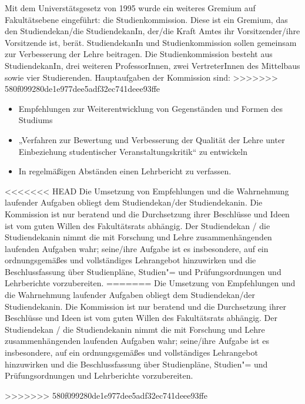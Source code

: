 Mit dem Universtätsgesetz von 1995 wurde ein weiteres Gremium auf Fakultätsebene 
eingeführt: die Studienkommission. Diese ist ein Gremium, das den Studiendekan/die
StudiendekanIn, der/die Kraft Amtes ihr Vorsitzender/ihre Vorsitzende ist, berät.
StudiendekanIn und Studienkommission sollen gemeinsam zur Verbesserung der Lehre
beitragen. Die Studienkommission besteht aus StudiendekanIn, drei weiteren
ProfessorInnen, zwei VertreterInnen des Mittelbaus sowie vier Studierenden.
Hauptaufgaben der Kommission sind:
>>>>>>> 580f099280de1e977dee5adf32ec741deee93ffe
\begin{itemize}
    \addtolength{\itemsep}{-0.7\baselineskip}
    \item Empfehlungen zur Weiterentwicklung von Gegenständen und Formen des Studiums
    \item „Verfahren zur Bewertung und Verbesserung  der Qualität der Lehre unter
          Einbeziehung studentischer Veranstaltungskritik“ zu entwickeln
    \item In regelmäßigen Abständen einen Lehrbericht zu verfassen.
\end{itemize}

<<<<<<< HEAD
Die Umsetzung von Empfehlungen und die Wahrnehmung laufender Aufgaben obliegt
dem Studiendekan/der Studiendekanin. Die Kommission ist nur beratend und die
Durchsetzung ihrer Beschlüsse und Ideen ist vom guten Willen des Fakultätsrats
abhängig. Der Studiendekan / die Studiendekanin nimmt die mit Forschung und
Lehre zusammenhängenden laufenden Aufgaben wahr; seine/ihre Aufgabe ist es
insbesondere, auf ein ordnungsgemäßes und vollständiges Lehrangebot hinzuwirken
und die Beschlussfassung über Studienpläne, Studien"= und Prüfungsordnungen und
Lehrberichte vorzubereiten.
=======
Die Umsetzung von Empfehlungen und die Wahrnehmung laufender Aufgaben
obliegt dem Studiendekan/der Studiendekanin. Die Kommission ist nur
beratend und die Durchsetzung ihrer Beschlüsse und Ideen ist vom guten
Willen des Fakultätsrats abhängig. Der Studiendekan / die Studiendekanin
nimmt die mit Forschung und Lehre zusammenhängenden laufenden Aufgaben
wahr; seine/ihre Aufgabe ist es insbesondere, auf ein ordnungsgemäßes und
vollständiges Lehrangebot hinzuwirken und die Beschlussfassung über
Studienpläne, Studien"= und Prüfungsordnungen und Lehrberichte
vorzubereiten.


>>>>>>> 580f099280de1e977dee5adf32ec741deee93ffe
